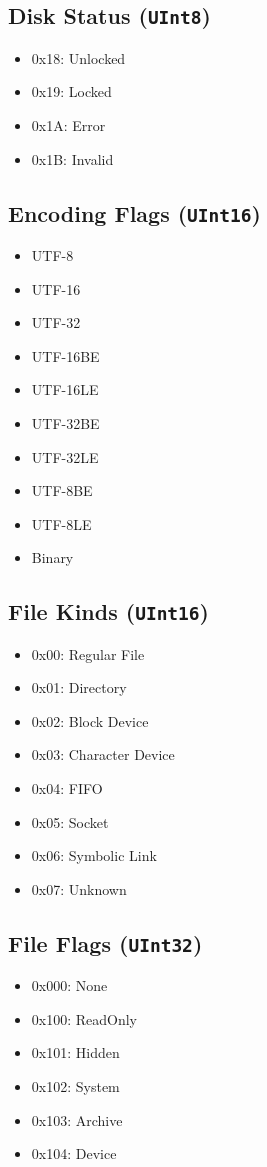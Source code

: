 \documentclass{article}
\begin{document}
\subsection{Disk Status (\texttt{UInt8})}
\begin{itemize}
\item 0x18: Unlocked
\item 0x19: Locked
\item 0x1A: Error
\item 0x1B: Invalid
\end{itemize}

\subsection{Encoding Flags (\texttt{UInt16})}
\begin{itemize}
\item UTF-8
\item UTF-16
\item UTF-32
\item UTF-16BE
\item UTF-16LE
\item UTF-32BE
\item UTF-32LE
\item UTF-8BE
\item UTF-8LE
\item Binary
\end{itemize}

\subsection{File Kinds (\texttt{UInt16})}
\begin{itemize}
\item 0x00: Regular File
\item 0x01: Directory
\item 0x02: Block Device
\item 0x03: Character Device
\item 0x04: FIFO
\item 0x05: Socket
\item 0x06: Symbolic Link
\item 0x07: Unknown
\end{itemize}

\subsection{File Flags (\texttt{UInt32})}
\begin{itemize}
\item 0x000: None
\item 0x100: ReadOnly
\item 0x101: Hidden
\item 0x102: System
\item 0x103: Archive
\item 0x104: Device
\end{itemize}
\end{document}
